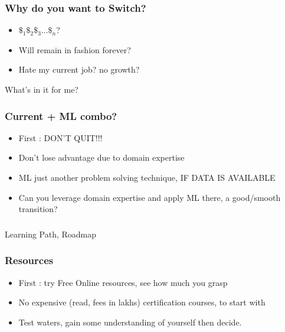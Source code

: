 \begin{frame}[fragile]\frametitle{Why do you want to Switch?}

      \begin{itemize}
			\item $\$_1\$_2\$_3 \ldots \$_n$?
			\item Will remain in fashion forever?
			\item Hate my current job? no growth?
			\end{itemize}
			
			What's in it for me?
\end{frame}

\begin{frame}[fragile]\frametitle{Current + ML combo?}

      \begin{itemize}
			\item First : DON'T QUIT!!!
			\item Don't lose advantage due to domain expertise
			\item ML just another problem solving technique, IF DATA IS AVAILABLE
			\item Can you leverage domain expertise and apply ML there, a good/smooth transition?
			\end{itemize}
			
\end{frame}

\begin{frame}[fragile]\frametitle{}
	
	\begin{center}
	{\Large Learning Path, Roadmap}  
	\end{center}

\end{frame}


\begin{frame}[fragile]\frametitle{Resources}

      \begin{itemize}
			\item First : try Free Online resources, see how much you grasp
			\item No expensive (read, fees in lakhs) certification courses, to start with
			\item Test waters, gain some understanding of yourself then decide.
			\end{itemize}
			
\end{frame}

